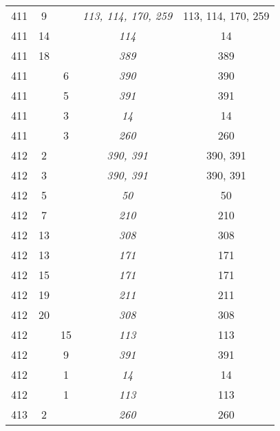 \documentclass[a4paper,11pt]{article}
\begin{document}
\begin{center}
\begin{tabular}{|c|c|c|c|c|}
    411 &  9 & & \textit{113, 114, 170, 259} & 113, 114, 170, 259 \\
    411 & 14 & & \textit{114} & 14 \\
    411 & 18 & & \textit{389} & 389 \\
    411 & &  6 & \textit{390} & 390 \\
    411 & &  5 & \textit{391} & 391 \\
    411 & &  3 & \emph{14}  & 14 \\
    411 & &  3 & \emph{260} & 260 \\
    412 &  2 & & \emph{390, 391} & 390, 391 \\
    412 &  3 & & \emph{390, 391} & 390, 391 \\
    412 &  5 & & \emph{50}  & 50 \\
    412 &  7 & & \emph{210} & 210 \\
    412 & 13 & & \emph{308} & 308 \\
    412 & 13 & & \emph{171} & 171 \\
    412 & 15 & & \emph{171} & 171 \\
    412 & 19 & & \emph{211} & 211 \\
    412 & 20 & & \emph{308} & 308 \\
    412 & & 15 & \emph{113} & 113 \\
    412 & &  9 & \emph{391} & 391 \\
    412 & &  1 & \emph{14}  & 14 \\
    412 & &  1 & \emph{113} & 113 \\
    413 &  2 & & \emph{260} & 260 \\
    \hline
  \end{tabular}






\end{center}
\end{document}
